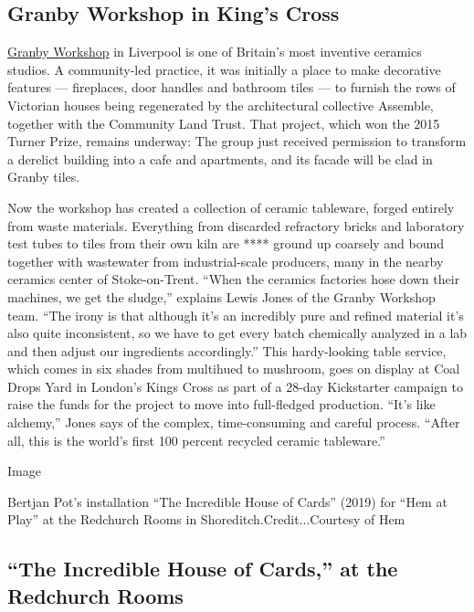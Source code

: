 \hypertarget{granby-workshop-in-kings-cross}{%
\subsection{Granby Workshop in King's
Cross}\label{granby-workshop-in-kings-cross}}

\href{https://www.londondesignfestival.com/event/granby-workshop-launch-worlds-first-ceramic-tableware-made-100-waste}{Granby
Workshop} in Liverpool is one of Britain's most inventive ceramics
studios. A community-led practice, it was initially a place to make
decorative features --- fireplaces, door handles and bathroom tiles ---
to furnish the rows of Victorian houses being regenerated by the
architectural collective Assemble, together with the Community Land
Trust. That project, which won the 2015 Turner Prize, remains underway:
The group just received permission to transform a derelict building into
a cafe and apartments, and its facade will be clad in Granby tiles.

Now the workshop has created a collection of ceramic tableware, forged
entirely from waste materials. Everything from discarded refractory
bricks and laboratory test tubes to tiles from their own kiln are ****
ground up coarsely and bound together with wastewater from
industrial-scale producers, many in the nearby ceramics center of
Stoke-on-Trent. ``When the ceramics factories hose down their machines,
we get the sludge,'' explains Lewis Jones of the Granby Workshop team.
``The irony is that although it's an incredibly pure and refined
material it's also quite inconsistent, so we have to get every batch
chemically analyzed in a lab and then adjust our ingredients
accordingly.'' This hardy-looking table service, which comes in six
shades from multihued to mushroom, goes on display at Coal Drops Yard in
London's Kings Cross as part of a 28-day Kickstarter campaign to raise
the funds for the project to move into full-fledged production. ``It's
like alchemy,'' Jones says of the complex, time-consuming and careful
process. ``After all, this is the world's first 100 percent recycled
ceramic tableware.''

Image

Bertjan Pot's installation ``The Incredible House of Cards'' (2019) for
``Hem at Play'' at the Redchurch Rooms in Shoreditch.Credit...Courtesy
of Hem

\hypertarget{the-incredible-house-of-cards-at-the-redchurch-rooms}{%
\subsection{``The Incredible House of Cards,'' at the Redchurch
Rooms}\label{the-incredible-house-of-cards-at-the-redchurch-rooms}}

